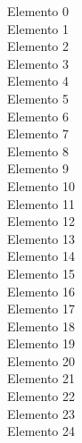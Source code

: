 \documentclass[preview]{standalone}
\begin{document}
Elemento 0\\Elemento 1\\Elemento 2\\Elemento 3\\Elemento 4\\Elemento 5\\Elemento 6\\Elemento 7\\Elemento 8\\Elemento 9\\Elemento 10\\Elemento 11\\Elemento 12\\Elemento 13\\Elemento 14\\Elemento 15\\Elemento 16\\Elemento 17\\Elemento 18\\Elemento 19\\Elemento 20\\Elemento 21\\Elemento 22\\Elemento 23\\Elemento 24
\end{document}
